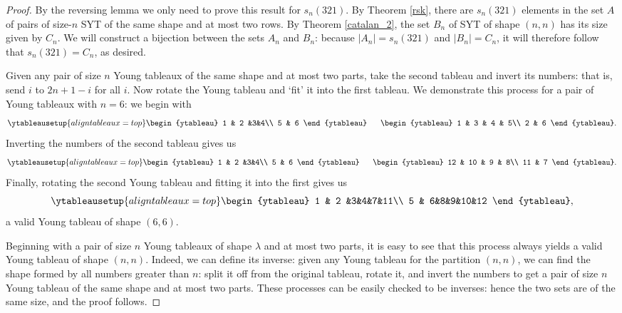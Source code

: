 \documentclass[11pt,letterpaper,twoside,english]{article}
\theoremstyle{theorem}
\theoremstyle{remark}
\begin{document}
\begin{proof}
By the reversing lemma we only need to prove this result for $s_n(321)$. By Theorem \ref{rsk}, there are $s_n(321)$ elements in the set $A$ of pairs of size-$n$ SYT of the same shape and at most two rows. By Theorem \ref{catalan_2}, the set $B_n$ of SYT of shape $(n, n)$ has its size given by $C_n$. We will construct a bijection between the sets $A_n$ and $B_n$: because $|A_n|=s_n(321)$ and $|B_n|=C_n$, it will therefore follow that $s_n(321)=C_n$, as desired.

Given any pair of size $n$ Young tableaux of the same shape and at most two parts, take the second tableau and invert its numbers: that is, send $i$ to $2n+1-i$ for all $i$. Now rotate the Young tableau and `fit' it into the first tableau. We demonstrate this process for a pair of Young tableaux with $n=6$: we begin with
\[\ytableausetup{aligntableaux=top}
\begin{ytableau}
1 & 2 &3&4\\
5 & 6
\end{ytableau} \ \ \ \ \ 
\hfill
\begin{ytableau}
1 & 3 & 4 & 5\\
2 & 6
\end{ytableau}.\]
Inverting the numbers of the second tableau gives us
\[\ytableausetup{aligntableaux=top}
\begin{ytableau}
1 & 2 &3&4\\
5 & 6
\end{ytableau} \ \ \ \ \ 
\hfill
\begin{ytableau}
12 & 10 & 9 & 8\\
11 & 7
\end{ytableau}.\]
Finally, rotating the second Young tableau and fitting it into the first gives us
\[\ytableausetup{aligntableaux=top}
\begin{ytableau}
1 & 2 &3&4&7&11\\
5 & 6&8&9&10&12
\end{ytableau},\]
a valid Young tableau of shape $(6, 6)$. 

Beginning with a pair of size $n$ Young tableaux of shape $\lambda$ and at most two parts, it is easy to see that this process always yields a valid Young tableau of shape $(n, n)$. Indeed, we can define its inverse: given any Young tableau for the partition $(n, n)$, we can find the shape formed by all numbers greater than $n$: split it off from the original tableau, rotate it, and invert the numbers to get a pair of size $n$ Young tableau of the same shape and at most two parts. These processes can be easily checked to be inverses: hence the two sets are of the same size, and the proof follows.
\end{proof}
\end{document}
